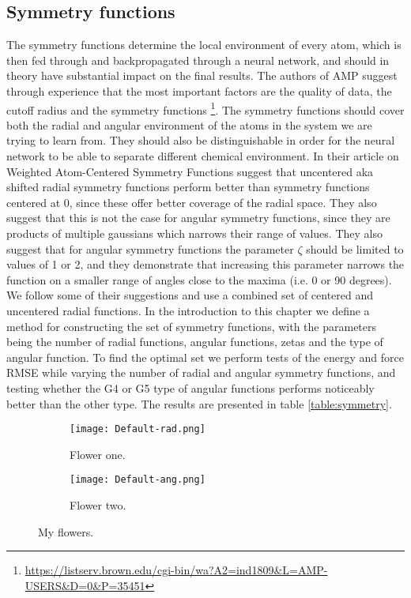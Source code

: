 \subsection{Symmetry functions}
The symmetry functions determine the local environment of every atom,
which is then fed through and backpropagated through a neural network,
and should in theory have substantial impact on the final results.
The authors of AMP suggest through experience that the most important
factors are the quality of data, the cutoff radius and the symmetry functions
\footnote{\url{
https://listserv.brown.edu/cgi-bin/wa?A2=ind1809&L=AMP-USERS&D=0&P=35451}}.
The symmetry functions should cover both the radial and angular
environment of the atoms in the system we are trying to learn from.
They should also be distinguishable in order for the neural network
to be able to separate different chemical environment.
In their article on Weighted Atom-Centered Symmetry Functions
\parencite[Gastegger et al.]{gastegger2018wacsf} suggest that uncentered
aka shifted radial symmetry functions perform better than symmetry functions
centered at 0, since these offer better coverage of the radial space.
They also suggest that this is not the case for angular symmetry functions,
since they are products of multiple gaussians which narrows their range
of values. They also suggest that for angular symmetry functions
the parameter $\zeta$ should be limited to values of 1 or 2,
and they demonstrate that increasing this parameter narrows
the function on a smaller range of angles close to the maxima
(i.e. 0 or 90 degrees).
We follow some of their suggestions and use a combined set of
centered and uncentered radial functions. 
In the introduction to this chapter we define a method
for constructing the set of symmetry functions, with the parameters
being the number of radial functions, angular functions, zetas
and the type of angular function.
To find the optimal set
we perform tests of the energy and force RMSE while varying the
number of radial and angular symmetry functions, and testing
whether the G4 or G5 type of angular functions performs noticeably
better than the other type.
The results are presented in table \ref{table:symmetry}.

\begin{figure}[!tbp]
\begin{adjustbox}{max width=1.2\linewidth,center}
\centering
  \begin{subfigure}[b]{0.55\textwidth}
      \texttt{[image: Default-rad.png]}
    \caption{Flower one.}
    \label{fig:f1}
  \end{subfigure}
  \hfill
  \begin{subfigure}[b]{0.55\textwidth}
      \texttt{[image: Default-ang.png]}
    \caption{Flower two.}
    \label{fig:f2}
  \end{subfigure}
\end{adjustbox}
\caption{My flowers.}
\end{figure}

